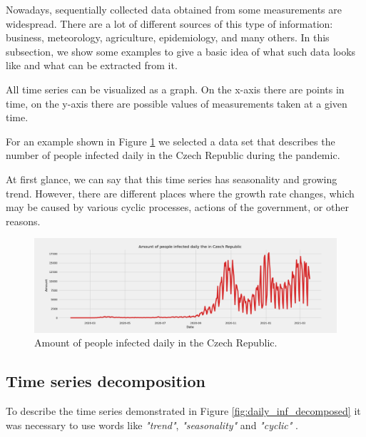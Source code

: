 Nowadays, sequentially collected data obtained from some measurements are widespread. There are a lot of different sources of this type of information: business, meteorology, agriculture, epidemiology, and many others.  In this subsection, we show some examples to give a basic idea of what such data looks like and what can be extracted from it.

All time series can be visualized as a graph. On the x-axis there are points in time, on the y-axis there are possible values of measurements taken at a given time.

For an example shown in Figure \ref{fig:daily_inf} we selected a data set that describes the number of people infected daily in the Czech Republic during the pandemic.

At first glance, we can say that this time series has seasonality and growing trend. However, there are different places where the growth rate changes, which may be caused by various cyclic processes, actions of the government, or other reasons.

\begin{figure}[t]
\centering
\includegraphics[width=1\textwidth, height=0.5\textwidth]{figures/chapter_02/daily_infected.png}
\caption{Amount of people infected daily in the Czech Republic.}
\label{fig:daily_inf}
\end{figure}

\subsection{Time series decomposition}

To describe the time series demonstrated in Figure \ref{fig:daily_inf_decomposed} it was necessary to use words like \textit{"trend"}, \textit{"seasonality"} and \textit{"cyclic"} \cite{Hyndman2018}. 

